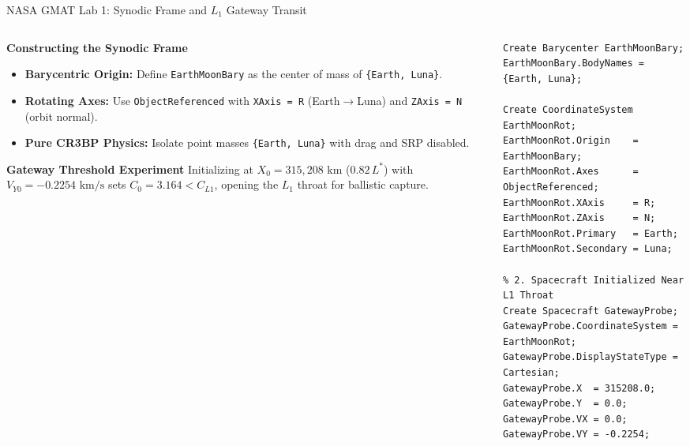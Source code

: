 \documentclass[aspectratio=169, 10pt]{beamer}
\begin{document}
\begin{frame}[fragile]{NASA GMAT Lab 1: Synodic Frame and $L_1$ Gateway Transit}
    \begin{columns}[t]
        \begin{column}{0.46\textwidth}
            \begin{block}{\textbf{Constructing the Synodic Frame}}
                \scriptsize
                \begin{itemize}\setlength{\itemsep}{2pt}
                    \item \textbf{Barycentric Origin:} Define \texttt{EarthMoonBary} as the center of mass of \texttt{\{Earth, Luna\}}.
                    \item \textbf{Rotating Axes:} Use \texttt{ObjectReferenced} with \texttt{XAxis = R} (Earth$\to$Luna) and \texttt{ZAxis = N} (orbit normal).
                    \item \textbf{Pure CR3BP Physics:} Isolate point masses \texttt{\{Earth, Luna\}} with drag and SRP disabled.
                \end{itemize}
            \end{block}
            \vspace{-0.1cm}
            \begin{exampleblock}{\textbf{Gateway Threshold Experiment}}
                \scriptsize
                Initializing at $X_0 = 315,208\text{ km}$ ($0.82\,L^*$) with $V_{Y0} = -0.2254\text{ km/s}$ sets $C_0 = 3.164 < C_{L1}$, opening the $L_1$ throat for ballistic capture.
            \end{exampleblock}
        \end{column}
        
        \begin{column}{0.52\textwidth}
\begin{lstlisting}[style=gmatstyle]
% 1. Barycenter & Synodic Rotating Frame
Create Barycenter EarthMoonBary;
EarthMoonBary.BodyNames = {Earth, Luna};

Create CoordinateSystem EarthMoonRot;
EarthMoonRot.Origin    = EarthMoonBary;
EarthMoonRot.Axes      = ObjectReferenced;
EarthMoonRot.XAxis     = R;
EarthMoonRot.ZAxis     = N;
EarthMoonRot.Primary   = Earth;
EarthMoonRot.Secondary = Luna;

% 2. Spacecraft Initialized Near L1 Throat
Create Spacecraft GatewayProbe;
GatewayProbe.CoordinateSystem = EarthMoonRot;
GatewayProbe.DisplayStateType = Cartesian;
GatewayProbe.X  = 315208.0;   GatewayProbe.Y  = 0.0;
GatewayProbe.VX = 0.0;        GatewayProbe.VY = -0.2254;


\end{lstlisting}
\end{column}
\end{columns}
\end{frame}
\end{document}
